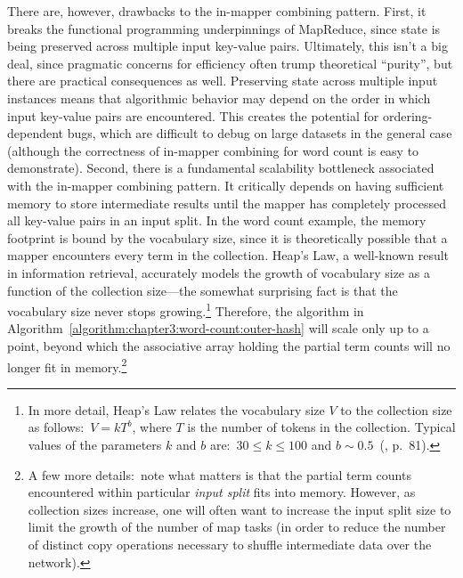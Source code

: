 There are, however, drawbacks to the in-mapper combining pattern.
First, it breaks the functional programming underpinnings of
MapReduce, since state is being preserved across multiple input
key-value pairs.  Ultimately, this isn't a big deal, since pragmatic
concerns for efficiency often trump theoretical ``purity'', but there
are practical consequences as well.  Preserving state across multiple
input instances means that algorithmic behavior may depend on the
order in which input key-value pairs are encountered.  This creates
the potential for ordering-dependent bugs, which are difficult to
debug on large datasets in the general case (although the correctness
of in-mapper combining for word count is easy to demonstrate).
Second, there is a fundamental scalability bottleneck associated with
the in-mapper combining pattern.  It critically depends on having
sufficient memory to store intermediate results until the mapper has
completely processed all key-value pairs in an input split.  In the
word count example, the memory footprint is bound by the vocabulary
size, since it is theoretically possible that a mapper encounters
every term in the collection.  Heap's Law, a well-known result in
information retrieval, accurately models the growth of vocabulary size
as a function of the collection size---the somewhat surprising fact is
that the vocabulary size never stops growing.\footnote{In more detail,
  Heap's Law relates the vocabulary size $V$ to the collection size as
  follows:\ $V =kT^b$, where $T$ is the number of tokens in the
  collection.  Typical values of the parameters $k$ and $b$ are:\ $30
  \leq k \leq 100$ and $b \sim 0.5$~(\cite{Manning_etal_2008},
  p.\ 81).}  Therefore, the algorithm in
Algorithm~\ref{algorithm:chapter3:word-count:outer-hash} will scale only up
to a point, beyond which the associative array holding the partial
term counts will no longer fit in memory.\footnote{A few more
  details:\ note what matters is that the partial term counts
  encountered within particular \emph{input split} fits into memory.
  However, as collection sizes increase, one will often want to
  increase the input split size to limit the growth of the number of
  map tasks (in order to reduce the number of distinct copy operations
  necessary to shuffle intermediate data over the network).}

